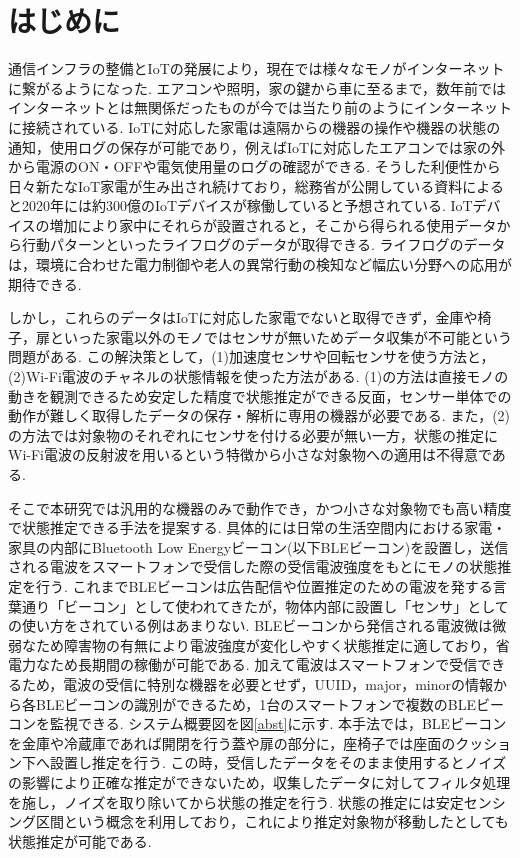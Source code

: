 \documentclass[Japanese]{dicomopapers}
\begin{document}
\section{はじめに}
通信インフラの整備とIoTの発展により，現在では様々なモノがインターネットに繋がるようになった.
エアコンや照明，家の鍵から車に至るまで，数年前ではインターネットとは無関係だったものが今では当たり前のようにインターネットに接続されている.
IoTに対応した家電は遠隔からの機器の操作や機器の状態の通知，使用ログの保存が可能であり，例えばIoTに対応したエアコンでは家の外から電源のON・OFFや電気使用量のログの確認ができる.
そうした利便性から日々新たなIoT家電が生み出され続けており，総務省が公開している資料\cite{soumusyo}によると2020年には約300億のIoTデバイスが稼働していると予想されている.
IoTデバイスの増加により家中にそれらが設置されると，そこから得られる使用データから行動パターンといったライフログのデータが取得できる.
ライフログのデータは，環境に合わせた電力制御や老人の異常行動の検知など幅広い分野への応用が期待できる.

しかし，これらのデータはIoTに対応した家電でないと取得できず，金庫や椅子，扉といった家電以外のモノではセンサが無いためデータ収集が不可能という問題がある.
この解決策として，(1)加速度センサや回転センサを使う方法と，(2)Wi-Fi電波のチャネルの状態情報を使った方法がある.
(1)の方法は直接モノの動きを観測できるため安定した精度で状態推定ができる反面，センサー単体での動作が難しく取得したデータの保存・解析に専用の機器が必要である.
また，(2)の方法では対象物のそれぞれにセンサを付ける必要が無い一方，状態の推定にWi-Fi電波の反射波を用いるという特徴から小さな対象物への適用は不得意である.

そこで本研究では汎用的な機器のみで動作でき，かつ小さな対象物でも高い精度で状態推定できる手法を提案する.
具体的には日常の生活空間内における家電・家具の内部にBluetooth Low Energyビーコン(以下BLEビーコン)を設置し，送信される電波をスマートフォンで受信した際の受信電波強度をもとにモノの状態推定を行う.
これまでBLEビーコンは広告配信や位置推定のための電波を発する言葉通り「ビーコン」として使われてきたが，物体内部に設置し「センサ」としての使い方をされている例はあまりない.
BLEビーコンから発信される電波微は微弱なため障害物の有無により電波強度が変化しやすく状態推定に適しており，省電力なため長期間の稼働が可能である.
加えて電波はスマートフォンで受信できるため，電波の受信に特別な機器を必要とせず，UUID，major，minorの情報から各BLEビーコンの識別ができるため，1台のスマートフォンで複数のBLEビーコンを監視できる.
システム概要図を図\ref{abst}に示す.
本手法では，BLEビーコンを金庫や冷蔵庫であれば開閉を行う蓋や扉の部分に，座椅子では座面のクッション下へ設置し推定を行う.
この時，受信したデータをそのまま使用するとノイズの影響により正確な推定ができないため，収集したデータに対してフィルタ処理を施し，ノイズを取り除いてから状態の推定を行う.
状態の推定には安定センシング区間という概念を利用しており，これにより推定対象物が移動したとしても状態推定が可能である.
\end{document}
